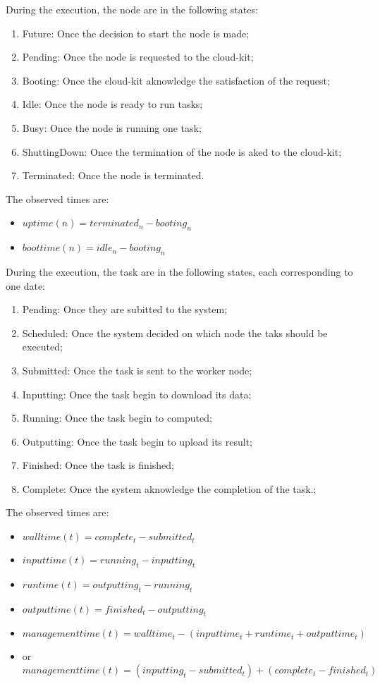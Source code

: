 \documentclass[parallelisme]{compas2017}
\begin{document}
During the execution, the node are in the following states:
\begin{enumerate}
 \item Future: Once the decision to start the node is made;
 \item Pending: Once the node is requested to the cloud-kit;
 \item Booting: Once the cloud-kit aknowledge the satisfaction of the request;
 \item Idle: Once the node is ready to run tasks;
 \item Busy: Once the node is running one task;
 \item ShuttingDown: Once the termination of the node is aked to the cloud-kit;
 \item Terminated: Once the node is terminated.
\end{enumerate}

The observed times are:
\begin{itemize}
 \item $uptime(n) = terminated_n - booting_n$ 
 \item $boottime(n) = idle_n - booting_n$ 
\end{itemize}


During the execution, the task are in the following states, each corresponding to one date:
\begin{enumerate}
 \item Pending: Once they are subitted to the system;
 \item Scheduled: Once the system decided on which node the taks should be executed;
 \item Submitted: Once the task is sent to the worker node;
 \item Inputting: Once the task begin to download its data;
 \item Running: Once the task begin to computed;
 \item Outputting: Once the task begin to upload its result;
 \item Finished: Once the task is finished;
 \item Complete: Once the system aknowledge the completion of the task.;
\end{enumerate}

The observed times are:
\begin{itemize}
 \item $walltime(t) = complete_t - submitted_t$ 
 \item $inputtime(t) = running_t - inputting_t$
 \item $runtime(t) = outputting_t - running_t$
 \item $outputtime(t) = finished_t - outputting_t$
 \item $managementtime(t) = walltime_t - (inputtime_t+runtime_t+outputtime_t)$
 \item or $managementtime(t) = (inputting_t - submitted_t) + (complete_t - finished_t)$
\end{itemize}
\end{document}
